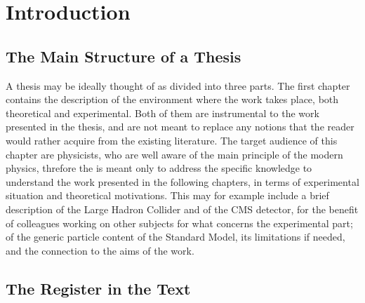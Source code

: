 \chapter{Introduction}



\section{The Main Structure of a Thesis}

A thesis may be ideally thought of as divided into three parts.
The first chapter contains the description of the environment where the work takes place,
both theoretical and experimental.
Both of them are instrumental to the work presented in the thesis, 
and are not meant to replace any notions that the reader would rather acquire 
from the existing literature.
The target audience of this chapter are physicists,
who are well aware of the main principle of the modern physics,
threfore the is meant only to address the specific knowledge to understand the work presented
in the following chapters,
in terms of experimental situation and theoretical motivations.
This may for example include a brief description of the Large Hadron Collider
and of the CMS detector, for the benefit of colleagues working on other subjects
for what concerns the experimental part; 
of the generic particle content of the Standard Model,
its limitations if needed,
and the connection to the aims of the work. \cite{2006MNRAS.372..961K}


\section{The Register in the Text}

